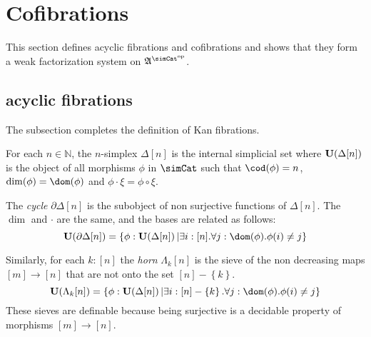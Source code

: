 \documentclass{tac}
\newcommand\hide[1]{}
\newcommand\set[1]{\left\{#1\right\}}
\newcommand\N{\mathbb N}
\newcommand\dual{^{\mathrm{op}}}
\newcommand\s{^{\simCat\dual}}
\newcommand\of{:}
\newcommand\simplex\Delta
\newcommand\cycle{\partial\Delta}
\newcommand\horn\Lambda
\newcommand\ambient{\mathfrak A}
\begin{document}
\section{Cofibrations}%
This section defines acyclic fibrations and cofibrations and shows that they form a weak factorization system on $\ambient\s$.

\subsection{acyclic fibrations}
\hide{ 

Idea: define Kan fibrations, define cofibrations, demonstrate the lifting properties. Move on happily.

New idea: go by factorization system.

}
The subsection completes the definition of Kan fibrations.

\hide{ Add def. of sieve over $\simCat$
Wrong: I was calling it a sieve because I was thinking of the category of elements of $\simplex[n]$
$\ambient\s$ defined?
Member functions for internal simplicial objects?
 }
\begin{definition} For each $n\in\N$, the $n$-simplex $\simplex[n]$ is the internal simplicial set where $\base{\simplex[n]}$ is the object of all morphisms $\phi$ in $\simCat$ such that $\cod(\phi) = n$, $\dim(\phi) = \dom(\phi)$ and $\phi\cdot \xi = \phi\circ \xi$.

The \emph{cycle} $\cycle[n]$ is the subobject of non surjective functions of $\simplex[n]$. The $\dim$ and $\cdot$ are the same, and the bases are related as follows:
\[ \base{\cycle[n]} = \set{\phi\of\base{\simplex[n]}| \exists i\of[n].\forall j\of \dom(\phi).\phi(i)\neq j } \]

Similarly, for each $k\of[n]$ the \emph{horn} $\horn_k[n]$ is the sieve of the non decreasing maps $[m]\to [n]$ that are not onto the set $[n]-\set{k}$.
\[ \base{\horn_k[n]} = \set{\phi\of\base{\simplex[n]}| \exists i\of[n]-\set k.\forall j\of \dom(\phi).\phi(i)\neq j } \]
These sieves are definable because being surjective is a decidable property of morphisms $[m]\to[n]$. 
\end{definition}
\end{document}

